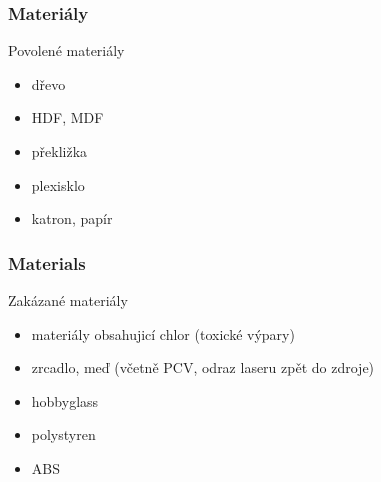 \documentclass[14pt]{beamer}
\begin{document}






\begin{frame}
\frametitle{Materiály}


\begin{examples}{Povolené materiály}
	\begin{itemize}
		\item dřevo
		\item HDF, MDF
		\item překližka
		\item plexisklo
		\item katron, papír
	\end{itemize}
\end{examples}




\end{frame}

\begin{frame}
\frametitle{Materials}

\begin{alertblock}{Zakázané materiály}
	\begin{itemize}
		\item materiály obsahujicí chlor (toxické výpary)
		\item zrcadlo, meď (včetně PCV, odraz laseru zpět do zdroje)
		\item hobbyglass
		\item polystyren
		\item ABS
	\end{itemize}
\end{alertblock}

\end{frame}
\end{document}
